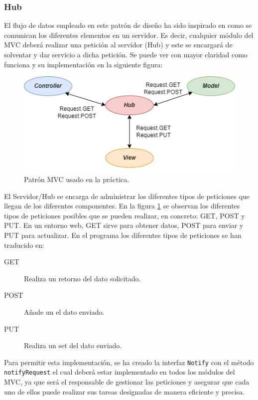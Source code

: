 \subsubsection{Hub}

El flujo de datos empleado en este patrón de diseño ha sido inspirado en como se comunican los diferentes elementos en un servidor. Es decir, cualquier módulo del MVC deberá realizar una petición al servidor (Hub) y este se encargará de solventar y dar servicio a dicha petición. Se puede ver con mayor claridad como funciona y su implementación en la siguiente figura:\bigskip

\begin{figure}[!h]
    \centering
    \includegraphics[width=\linewidth]{MVC/img/flujocom.png}
    \caption{Patrón MVC usado en la práctica.}
    \label{fig:flujo_datos}
\end{figure}

El Servidor/Hub se encarga de administrar los diferentes tipos de peticiones que llegan de los diferentes componentes. En la figura \ref{fig:flujo_datos} se observan los diferentes tipos de peticiones posibles que se pueden realizar, en concreto: GET, POST y PUT. En un entorno web, GET sirve para obtener datos, POST para enviar y PUT para actualizar. En el programa los diferentes tipos de peticiones se han traducido en: \medskip

\begin{description}
    \item[GET  ] Realiza un retorno del dato solicitado.
    \item[POST] Añade un el dato enviado.
    \item[PUT  ] Realiza un set del dato enviado.
\end{description}\medskip

Para permitir esta implementación, se ha creado la interfaz \texttt{Notify} con el método \texttt{notifyRequest} el cual deberá estar implementado en todos los módulos del MVC, ya que será el responsable de gestionar las peticiones y asegurar que cada uno de ellos puede realizar sus tareas designadas de manera eficiente y precisa.
